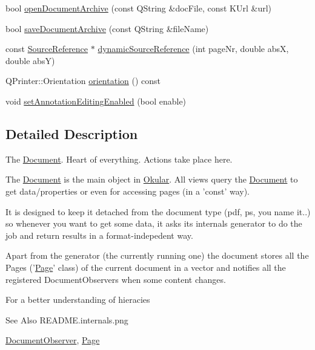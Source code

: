 \begin{DoxyCompactItemize}
\item 
bool \hyperlink{classOkular_1_1Document_a203b2307aa0d4baf08628cf70e21a3b4}{open\+Document\+Archive} (const Q\+String \&doc\+File, const K\+Url \&url)
\item 
bool \hyperlink{classOkular_1_1Document_aa5e6cbdeb702f6671847ca94b63a277a}{save\+Document\+Archive} (const Q\+String \&file\+Name)
\item 
const \hyperlink{classOkular_1_1SourceReference}{Source\+Reference} $\ast$ \hyperlink{classOkular_1_1Document_ab8a36b616b699744cc58e4f3ab03ed25}{dynamic\+Source\+Reference} (int page\+Nr, double abs\+X, double abs\+Y)
\item 
Q\+Printer\+::\+Orientation \hyperlink{classOkular_1_1Document_a0865032f8934fca262b382a6af9a5671}{orientation} () const 
\item 
void \hyperlink{classOkular_1_1Document_a064fa5a01f9597ef38858744ea17001b}{set\+Annotation\+Editing\+Enabled} (bool enable)
\end{DoxyCompactItemize}


\subsection{Detailed Description}
The \hyperlink{classOkular_1_1Document}{Document}. Heart of everything. Actions take place here. 

The \hyperlink{classOkular_1_1Document}{Document} is the main object in \hyperlink{namespaceOkular}{Okular}. All views query the \hyperlink{classOkular_1_1Document}{Document} to get data/properties or even for accessing pages (in a 'const' way).

It is designed to keep it detached from the document type (pdf, ps, you name it..) so whenever you want to get some data, it asks its internals generator to do the job and return results in a format-\/indepedent way.

Apart from the generator (the currently running one) the document stores all the Pages ('\hyperlink{classOkular_1_1Page}{Page}' class) of the current document in a vector and notifies all the registered Document\+Observers when some content changes.

For a better understanding of hieracies \begin{DoxySeeAlso}{See Also}
R\+E\+A\+D\+M\+E.\+internals.\+png 

\hyperlink{classOkular_1_1DocumentObserver}{Document\+Observer}, \hyperlink{classOkular_1_1Page}{Page} 
\end{DoxySeeAlso}


